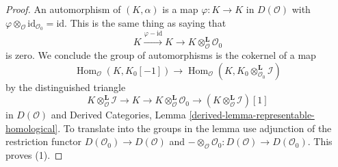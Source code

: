 \documentclass[10pt,a4paper]{amsart}
\theoremstyle{plain}
\theoremstyle{definition}
\theoremstyle{remark}
\numberwithin{equation}{subsection}
\def\Hom{\mathop{\mathrm{Hom}}\nolimits}
\begin{document}
\begin{proof}
An automorphism of $(K, \alpha)$ is a map $\varphi : K \to K$
in $D(\mathcal{O})$ with
$\varphi \otimes_\mathcal{O} \text{id}_{\mathcal{O}_0} = \text{id}$.
This is the same thing as saying that
$$
K \xrightarrow{\varphi - \text{id}} K \to
K \otimes_\mathcal{O}^\mathbf{L} \mathcal{O}_0
$$
is zero. We conclude the group of automorphisms is
the cokernel of a map
$$
\Hom_\mathcal{O}(K, K_0[-1])
\longrightarrow
\Hom_\mathcal{O}(K, K_0 \otimes_{\mathcal{O}_0}^\mathbf{L} \mathcal{I})
$$
by the distinguished triangle
$$
K \otimes_\mathcal{O}^\mathbf{L} \mathcal{I} \to
K \to
K \otimes_\mathcal{O}^\mathbf{L} \mathcal{O}_0 \to
(K \otimes_\mathcal{O}^\mathbf{L} \mathcal{I})[1]
$$
in $D(\mathcal{O})$ and 
Derived Categories, Lemma \ref{derived-lemma-representable-homological}.
To translate into the groups in the lemma use adjunction
of the restriction functor $D(\mathcal{O}_0) \to D(\mathcal{O})$ and
$- \otimes_\mathcal{O} \mathcal{O}_0 : D(\mathcal{O}) \to D(\mathcal{O}_0)$.
This proves (1).


\end{proof}
\end{document}
